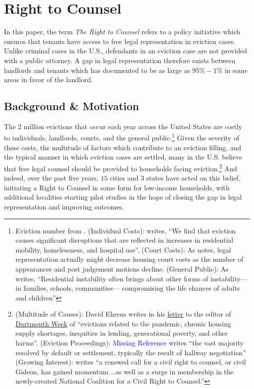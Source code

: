 \documentclass[a4paper,12pt]{article}
\begin{document}
\section{Right to Counsel}
In this paper, the term \textit{The Right to Counsel} refers to a policy initiative which ensures that tenants have access to free legal representation in eviction cases. Unlike criminal cases in the U.S., defendants in an eviction case are not provided with a public attorney. A gap in legal representation therefore exists between landlords and tenants which \cite{collinson2022eviction} has documented to be as large as $95\%-1\%$ in some areas in favor of the landlord.
\subsection{Background \& Motivation}
The 2 million evictions that occur each year across the United States are costly to individuals, landlords, courts, and the general public.\footnote{Eviction number from \cite{gromis2022estimating}. (Individual Costs): \cite{collinson2022eviction} writes, ``We find that eviction causes significant disruptions that are reflected in increases in residential mobility, homelessness, and hospital use''. (Court Costs): As \cite{seron2001impact} notes, legal representation actually might decrease housing court costs as the number of appearances and post judgement motions decline. (General Public): As \cite{desmond2019unaffordable} writes, ``Residential instability often brings about other forms of instability—in families, schools, communities— compromising the life chances of adults and children''} Given the severity of these costs, the multitude of factors which contribute to an eviction filling, and the typical manner in which eviction cases are settled, many in the U.S. believe that free legal counsel should be provided to households facing eviction.\footnote{(Multitude of Causes):  David Ehrens writes in his \href{https://dartmouth.theweektoday.com/article/opinion-support-right-counsel-renters/58185}{letter} to the editor of \href{https://dartmouth.theweektoday.com/}{Dartmouth Week} of ``evictions related to the pandemic, chronic housing supply shortages, inequities in lending, generational poverty, and other harms''. (Eviction Proceedings): \textcolor{blue}{Missing Reference} writes ``the vast majority resolved by default or settlement, typically the result of hallway negotiation'' (Growing Interest): \cite{engler2010connecting} writes ``a renewed call for a civil right to counsel, or civil Gideon, has gained momentum \dots as well as a surge in membership in the newly-created National Coalition for a Civil Right to Counsel.''} And indeed, over the past five years, $15$ cities and $3$ states have acted on this belief, initiating a Right to Counsel in some form for low-income households, with additional localities starting pilot studies in the hope of closing the gap in legal representation and improving outcomes. \par 
\end{document}
